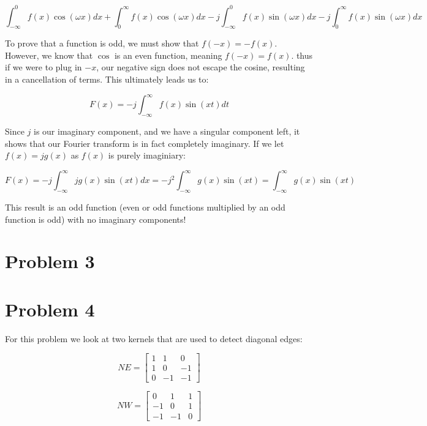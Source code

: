 \documentclass{article}
\begin{document}
\begin{equation}
    \int_{-\infty}^{0} f(x)\cos(\omega x) dx + \int_{0}^{\infty} f(x)\cos(\omega x) dx - j \int_{-\infty}^{0} f(x) \sin(\omega x) dx - j \int_{0}^{\infty} f(x) \sin(\omega x) dx
\end{equation}

\noindent To prove that a function is odd, we must show that $f(-x) = -f(x)$. However, we know that $\cos$ is an even function, meaning $f(-x)=f(x)$. thus if we were to plug in $-x$, our negative sign does not escape the cosine, resulting in a cancellation of terms. This ultimately leads us to:

\begin{equation}
    F(x) = -j \int_{-\infty}^{\infty} f(x) \sin(xt) dt
\end{equation}

\noindent Since $j$ is our imaginary component, and we have a singular component left, it shows that our Fourier transform is in fact completely imaginary. If we let $f(x) = jg(x)$ as $f(x)$ is purely imaginiary:

\begin{equation}
    F(x) = -j \int_{-\infty}^{\infty} jg(x) \sin(xt) dx = -j^2 \int_{-\infty}^{\infty} g(x) \sin(xt) = \int_{-\infty}^{\infty} g(x) \sin(xt)
\end{equation}

This result is an odd function (even or odd functions multiplied by an odd function is odd) with no imaginary components!


\section*{Problem 3}


\section*{Problem 4}
For this problem we look at two kernels that are used to detect diagonal edges:

\begin{equation}
    NE = \begin{bmatrix}
        1 & 1 & 0 \\
        1 & 0 & -1 \\
        0 & -1 & -1
    \end{bmatrix}
\end{equation}

\begin{equation}
    NW = \begin{bmatrix}
        0 & 1 & 1 \\
        -1 & 0 & 1 \\
        -1 & -1 & 0
    \end{bmatrix}
\end{equation}
\end{document}
